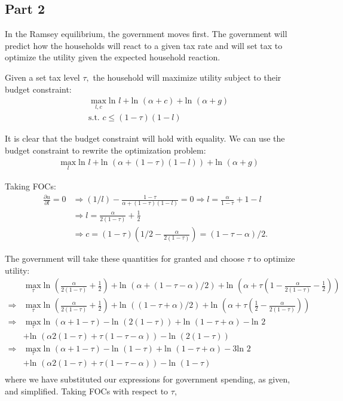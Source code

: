 \documentclass[11pt]{article} %
\begin{document}
\subsection{Part 2}
In the Ramsey equilibrium, the government moves first. The government will predict how the households will react to a given tax rate and will set tax to optimize the utility given the expected household reaction. 

Given a set tax level $\tau,$ the household will maximize utility subject to their budget constraint:
\begin{align*}
&\max_{l,c} \text{ln }l +\text{ln }(\alpha + c) +\text{ln }(\alpha + g)\\
&\text{s.t. } c \leq (1-\tau)(1-l)
\end{align*}

It is clear that the budget constraint will hold with equality. We can use the budget constraint to rewrite the optimization problem:
\begin{align*}
&\max_{l} \text{ln }l +\text{ln }(\alpha + (1-\tau)(1-l)) +\text{ln }(\alpha + g)
\end{align*}

Taking FOCs:
\begin{align*}
\frac{\partial u}{\partial l} = 0 &\Rightarrow (1/l) - \frac{1-\tau}{\alpha + (1-\tau)(1-l)} = 0 \Rightarrow l = \frac{\alpha}{1-\tau} +1 - l \\
&\Rightarrow l = \frac{\alpha}{2(1-\tau)} + \frac{1}{2}\\
&\Rightarrow c = (1-\tau)\left(1/2 -\frac{\alpha}{2(1-\tau)}  \right) = (1-\tau - \alpha)/2.
\end{align*}

The government will take these quantities for granted and choose $\tau$ to optimize utility:
\begin{align*}
&\max_{\tau} \text{ln }\left(\frac{\alpha}{2(1-\tau)} + \frac{1}{2}\right) +\text{ln }\left(\alpha + (1-\tau - \alpha)/2\right) +\text{ln }\left(\alpha + \tau\left(1- \frac{\alpha}{2(1-\tau)} - \frac{1}{2} \right)\right)\\
\Rightarrow &\max_{\tau}  \text{ln }\left(\frac{\alpha}{2(1-\tau)} + \frac{1}{2}\right) +\text{ln }\left( (1-\tau + \alpha)/2\right) +\text{ln }\left(\alpha + \tau\left(\frac{1}{2}- \frac{\alpha}{2(1-\tau)} \right)\right)\\
\Rightarrow &\max_{\tau}  \text{ln } (\alpha +1 - \tau) - \text{ln } (2(1-\tau)) + \text{ln }(1-\tau+\alpha) - \text{ln }2 \\&+ \text{ln }(\alpha 2(1-\tau) + \tau (1-\tau - \alpha)) - \text{ln }(2(1-\tau))\\
\Rightarrow &\max_{\tau}  \text{ln } (\alpha +1 - \tau) - \text{ln } (1-\tau) + \text{ln }(1-\tau+\alpha) - 3\text{ln }2 \\&+ \text{ln }(\alpha 2(1-\tau) + \tau (1-\tau - \alpha)) - \text{ln }(1-\tau)\\
\end{align*}
where we have substituted our expressions for government spending, as given, and simplified. Taking FOCs with respect to $\tau$,
\end{document}
